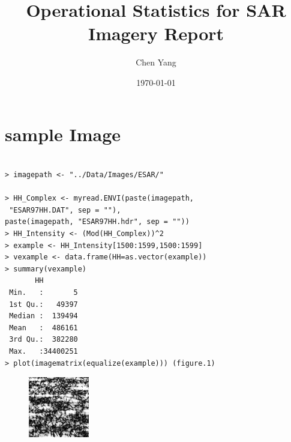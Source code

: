 \documentclass{article}
\title{Operational Statistics for SAR Imagery Report}
\author{Chen Yang}
\date\today
\begin{document}
\maketitle
\section{sample Image}
\begin{lstlisting}[frame=tb]

> imagepath <- "../Data/Images/ESAR/"

> HH_Complex <- myread.ENVI(paste(imagepath,
 "ESAR97HH.DAT", sep = ""), 
paste(imagepath, "ESAR97HH.hdr", sep = ""))
> HH_Intensity <- (Mod(HH_Complex))^2
> example <- HH_Intensity[1500:1599,1500:1599]
> vexample <- data.frame(HH=as.vector(example))
> summary(vexample)
       HH          
 Min.   :       5  
 1st Qu.:   49397  
 Median :  139494  
 Mean   :  486161  
 3rd Qu.:  382280  
 Max.   :34400251 
> plot(imagematrix(equalize(example))) (figure.1)
\end{lstlisting}

\begin{figure}[htb]
	\centering
	\includegraphics[width=0.5\linewidth]{example.png}
	\caption{}
	\label{fig:example}
\end{figure}
\end{document}
